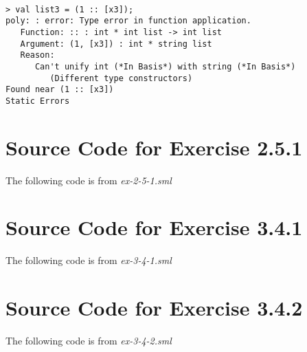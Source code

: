 \documentclass{report}
\begin{document}
\begin{session}
\begin{scriptsize}
\begin{verbatim}

> val list3 = (1 :: [x3]);
poly: : error: Type error in function application.
   Function: :: : int * int list -> int list
   Argument: (1, [x3]) : int * string list
   Reason:
      Can't unify int (*In Basis*) with string (*In Basis*)
         (Different type constructors)
Found near (1 :: [x3])
Static Errors
\end{verbatim}
\end{scriptsize}
\end{session}



\appendix{} 


\renewcommand{\thechapter}{\Alph{chapter}}

\chapter{Source Code for Exercise 2.5.1}
\label{cha:source-code-exercise}

The following code is from \textit{ex-2-5-1.sml}


\chapter{Source Code for Exercise 3.4.1}
\label{cha:source-code-exercise-1}

The following code is from \textit{ex-3-4-1.sml}


\chapter{Source Code for Exercise 3.4.2}
\label{cha:source-code-exercise-2}

The following code is from \textit{ex-3-4-2.sml}

\end{document}
